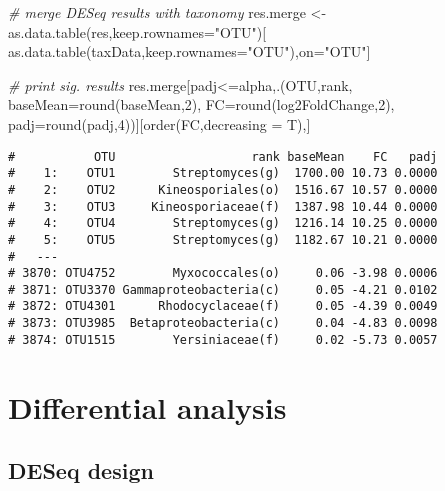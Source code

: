 \documentclass[
]{article}
\newenvironment{Shaded}{\begin{snugshade}}{\end{snugshade}}
\newcommand{\AttributeTok}[1]{\textcolor[rgb]{0.77,0.63,0.00}{#1}}
\newcommand{\CommentTok}[1]{\textcolor[rgb]{0.56,0.35,0.01}{\textit{#1}}}
\newcommand{\DecValTok}[1]{\textcolor[rgb]{0.00,0.00,0.81}{#1}}
\newcommand{\FunctionTok}[1]{\textcolor[rgb]{0.00,0.00,0.00}{#1}}
\newcommand{\NormalTok}[1]{#1}
\newcommand{\OtherTok}[1]{\textcolor[rgb]{0.56,0.35,0.01}{#1}}
\newcommand{\SpecialCharTok}[1]{\textcolor[rgb]{0.00,0.00,0.00}{#1}}
\newcommand{\StringTok}[1]{\textcolor[rgb]{0.31,0.60,0.02}{#1}}
\begin{document}
\begin{Shaded}
\begin{Highlighting}[]
\CommentTok{\# merge DESeq results with taxonomy}
\NormalTok{res.merge }\OtherTok{\textless{}{-}} \FunctionTok{as.data.table}\NormalTok{(res,}\AttributeTok{keep.rownames=}\StringTok{"OTU"}\NormalTok{)[}
  \FunctionTok{as.data.table}\NormalTok{(taxData,}\AttributeTok{keep.rownames=}\StringTok{"OTU"}\NormalTok{),on}\OtherTok{=}\StringTok{"OTU"}\NormalTok{]}

\CommentTok{\# print sig. results}
\NormalTok{res.merge[padj}\SpecialCharTok{\textless{}=}\NormalTok{alpha,.(OTU,rank,}
                        \AttributeTok{baseMean=}\FunctionTok{round}\NormalTok{(baseMean,}\DecValTok{2}\NormalTok{),}
                        \AttributeTok{FC=}\FunctionTok{round}\NormalTok{(log2FoldChange,}\DecValTok{2}\NormalTok{),}
                        \AttributeTok{padj=}\FunctionTok{round}\NormalTok{(padj,}\DecValTok{4}\NormalTok{))][}\FunctionTok{order}\NormalTok{(FC,}\AttributeTok{decreasing =}\NormalTok{ T),]}
\end{Highlighting}
\end{Shaded}

\begin{verbatim}
#           OTU                   rank baseMean    FC   padj
#    1:    OTU1        Streptomyces(g)  1700.00 10.73 0.0000
#    2:    OTU2      Kineosporiales(o)  1516.67 10.57 0.0000
#    3:    OTU3     Kineosporiaceae(f)  1387.98 10.44 0.0000
#    4:    OTU4        Streptomyces(g)  1216.14 10.25 0.0000
#    5:    OTU5        Streptomyces(g)  1182.67 10.21 0.0000
#   ---                                                     
# 3870: OTU4752        Myxococcales(o)     0.06 -3.98 0.0006
# 3871: OTU3370 Gammaproteobacteria(c)     0.05 -4.21 0.0102
# 3872: OTU4301      Rhodocyclaceae(f)     0.05 -4.39 0.0049
# 3873: OTU3985  Betaproteobacteria(c)     0.04 -4.83 0.0098
# 3874: OTU1515        Yersiniaceae(f)     0.02 -5.73 0.0057
\end{verbatim}

\hypertarget{differential-analysis-1}{%
\section{Differential analysis}\label{differential-analysis-1}}

\hypertarget{deseq-design-1}{%
\subsection{DESeq design}\label{deseq-design-1}}
\end{document}
